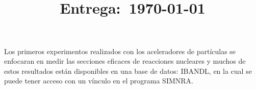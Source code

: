 \documentclass[12pt]{article}
\title{
    \textbf{\homeworknumber}\\
    \normalsize\vspace{0.1in}\small{\textbf{Entrega}:~\today}
    \vspace{-1.5in}
}
\author{}
\date{}
\theoremstyle{break}
\theoremstyle{nonumberbreak}
\begin{document}
    \maketitle
    \thispagestyle{fancy}

    Los primeros experimentos realizados con los aceleradores de partículas se enfocaran en medir las secciones eficaces de reacciones nucleares y muchos de estos resultados están disponibles en una base de datos: IBANDL, en la cual se puede tener acceso con un vínculo en el programa SIMNRA. 

    


\end{document}
